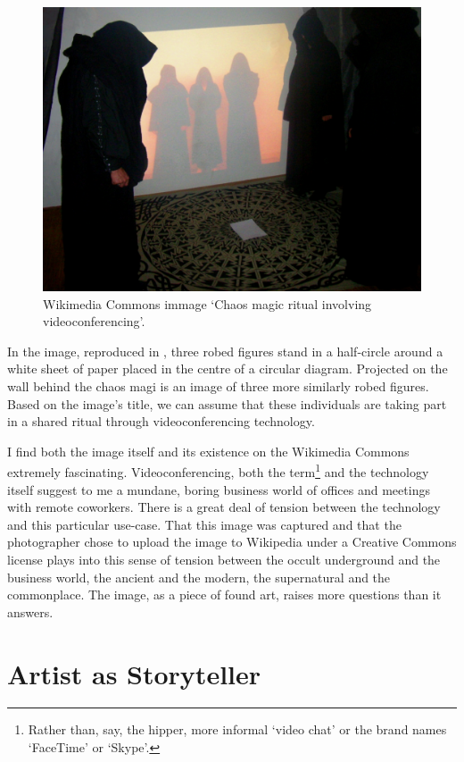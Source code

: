 \documentclass[a4paper,nobib]{tufte-handout}
\begin{document}
\begin{figure}
    \includegraphics{videoconferencing}
    \caption{Wikimedia Commons immage `Chaos magic ritual involving videoconferencing'.}
    \label{fig:videoconf}
\end{figure}

In the image, reproduced in \autocite{wiki:chaos}, three robed figures stand in a half-circle around a white sheet of paper placed in the centre of a circular diagram. Projected on the wall behind the chaos magi is an image of three more similarly robed figures. Based on the image's title, we can assume that these individuals are taking part in a shared ritual through videoconferencing technology.

I find both the image itself and its existence on the Wikimedia Commons extremely fascinating. Videoconferencing, both the term\footnote{Rather than, say, the hipper, more informal `video chat' or the brand names `FaceTime' or `Skype'.} and the technology itself suggest to me a mundane, boring business world of offices and meetings with remote coworkers. There is a great deal of tension between the technology and this particular use-case. That this image was captured and that the photographer chose to upload the image to Wikipedia under a Creative Commons license plays into this sense of tension between the occult underground and the business world, the ancient and the modern, the supernatural and the commonplace. The image, as a piece of found art, raises more questions than it answers.

\section{Artist as Storyteller}
\end{document}
